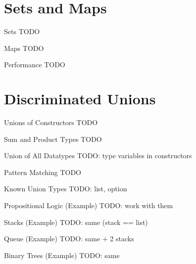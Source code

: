 \documentclass{beamer}
\begin{document}
\section{Sets and Maps}
\frame{\tableofcontents[currentsection]}

\begin{frame}{Sets}
  TODO
\end{frame}

\begin{frame}{Maps}
  TODO
\end{frame}

\begin{frame}{Performance}
  TODO
\end{frame}

\section{Discriminated Unions}
\frame{\tableofcontents[currentsection]}


\begin{frame}{Unions of Constructors}
  TODO
\end{frame}

\begin{frame}{Sum and Product Types}
  TODO
\end{frame}

\begin{frame}{Union of All Datatypes}
  TODO: type variables in constructors
\end{frame}

\begin{frame}{Pattern Matching}
  TODO
\end{frame}

\begin{frame}{Known Union Types}
  TODO: list, option
\end{frame}

\begin{frame}{Propositional Logic (Example)}
  TODO: work with them
\end{frame}

\begin{frame}{Stacks (Example)}
  TODO: same (stack == list)
\end{frame}

\begin{frame}{Queue (Example)}
  TODO: same + 2 stacks
\end{frame}

\begin{frame}{Binary Trees (Example)}
  TODO: same
\end{frame}
\end{document}

